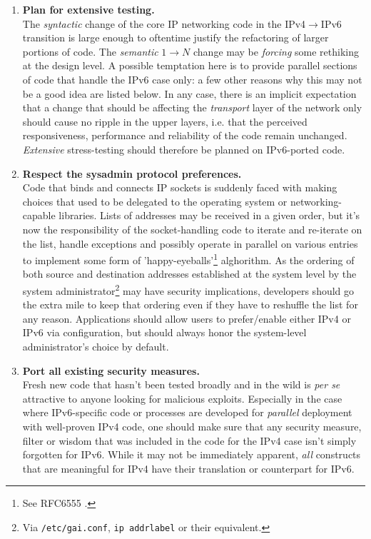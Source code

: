 \begin{enumerate}
\item {\bf Plan for extensive testing.}\\
      The {\it syntactic} change of the core IP networking code in the
      IPv4$\rightarrow$IPv6 transition is large enough to oftentime
      justify the refactoring of larger portions of code. The 
      {\it semantic} $1\rightarrow N$ change may be {\it forcing}
      some rethiking at the design level. A possible temptation here
      is to provide parallel sections of code that handle the IPv6 case
      only: a few other reasons why this may not be a good idea are
      listed below. In any case, there is an implicit expectation that 
      a change that should be affecting the {\it transport} layer of
      the network only should cause no ripple in the upper layers, i.e.
      that the perceived responsiveness, performance and reliability
      of the code remain unchanged. {\it Extensive} stress-testing should
      therefore be planned on IPv6-ported code. 
\item {\bf Respect the sysadmin protocol preferences.}\\
      Code that binds and connects IP sockets is suddenly faced with 
      making choices that used to be delegated to the operating system or
      networking-capable libraries. Lists of addresses may be received in
      a given order, but it's now the responsibility of the socket-handling
      code to iterate and re-iterate on the list, handle exceptions and
      possibly operate in parallel on various entries
      to implement some form of 'happy-eyeballs'\footnote{See RFC6555 \cite{rfc}.}
      alghorithm. As the ordering of both source and destination addresses
      established at the system level by the system
      administrator\footnote{Via {\tt /etc/gai.conf}, {\tt ip addrlabel} or their equivalent.}
      may have security implications, developers should go the extra mile to 
      keep that ordering even if they have to reshuffle the list for any reason.
      Applications should allow users to prefer/enable either IPv4 or IPv6 via
      configuration, but should always honor the system-level administrator's choice 
      by default.
\item {\bf Port all existing security measures.}\\
      Fresh new code that hasn't been tested broadly and in the 
      wild is {\it per se} attractive to anyone looking for
      malicious exploits. Especially in the case where IPv6-specific
      code or processes are developed for {\it parallel} deployment with
      well-proven IPv4 code, one should make sure that any security measure,
      filter or wisdom that was included in the code for the IPv4 case isn't
      simply forgotten for IPv6. While it may not be immediately apparent,
      {\it all} constructs that are meaningful for IPv4 have their
      translation or counterpart for IPv6.
\end{enumerate}
